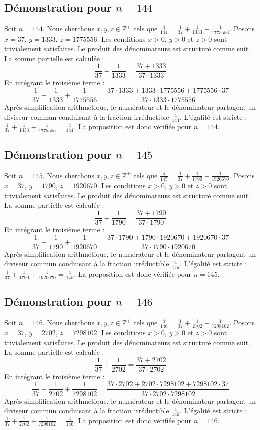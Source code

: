\documentclass[11pt,a4paper]{article}
\begin{document}
\subsection{Démonstration pour $n = 144$}
Soit $n = 144$. Nous cherchons $x, y, z \in \mathbb{Z}^{+}$ tels que $\frac{4}{144} = \frac{1}{37} + \frac{1}{1333} + \frac{1}{1775556}$.
Posons $x = 37$, $y = 1333$, $z = 1775556$.
Les conditions $x > 0$, $y > 0$ et $z > 0$ sont trivialement satisfaites.
Le produit des dénominateurs est structuré comme suit. La somme partielle est calculée :
$$ \frac{1}{37} + \frac{1}{1333} = \frac{37+1333}{37 \cdot 1333} $$
En intégrant le troisième terme :
$$ \frac{1}{37} + \frac{1}{1333} + \frac{1}{1775556} = \frac{37 \cdot 1333 + 1333 \cdot 1775556 + 1775556 \cdot 37}{37 \cdot 1333 \cdot 1775556} $$
Après simplification arithmétique, le numérateur et le dénominateur partagent un diviseur commun conduisant à la fraction irréductible $\frac{4}{144}$.
L'égalité est stricte : $\frac{1}{37} + \frac{1}{1333} + \frac{1}{1775556} = \frac{4}{144}$.
La proposition est donc vérifiée pour $n = 144$.
\subsection{Démonstration pour $n = 145$}
Soit $n = 145$. Nous cherchons $x, y, z \in \mathbb{Z}^{+}$ tels que $\frac{4}{145} = \frac{1}{37} + \frac{1}{1790} + \frac{1}{1920670}$.
Posons $x = 37$, $y = 1790$, $z = 1920670$.
Les conditions $x > 0$, $y > 0$ et $z > 0$ sont trivialement satisfaites.
Le produit des dénominateurs est structuré comme suit. La somme partielle est calculée :
$$ \frac{1}{37} + \frac{1}{1790} = \frac{37+1790}{37 \cdot 1790} $$
En intégrant le troisième terme :
$$ \frac{1}{37} + \frac{1}{1790} + \frac{1}{1920670} = \frac{37 \cdot 1790 + 1790 \cdot 1920670 + 1920670 \cdot 37}{37 \cdot 1790 \cdot 1920670} $$
Après simplification arithmétique, le numérateur et le dénominateur partagent un diviseur commun conduisant à la fraction irréductible $\frac{4}{145}$.
L'égalité est stricte : $\frac{1}{37} + \frac{1}{1790} + \frac{1}{1920670} = \frac{4}{145}$.
La proposition est donc vérifiée pour $n = 145$.
\subsection{Démonstration pour $n = 146$}
Soit $n = 146$. Nous cherchons $x, y, z \in \mathbb{Z}^{+}$ tels que $\frac{4}{146} = \frac{1}{37} + \frac{1}{2702} + \frac{1}{7298102}$.
Posons $x = 37$, $y = 2702$, $z = 7298102$.
Les conditions $x > 0$, $y > 0$ et $z > 0$ sont trivialement satisfaites.
Le produit des dénominateurs est structuré comme suit. La somme partielle est calculée :
$$ \frac{1}{37} + \frac{1}{2702} = \frac{37+2702}{37 \cdot 2702} $$
En intégrant le troisième terme :
$$ \frac{1}{37} + \frac{1}{2702} + \frac{1}{7298102} = \frac{37 \cdot 2702 + 2702 \cdot 7298102 + 7298102 \cdot 37}{37 \cdot 2702 \cdot 7298102} $$
Après simplification arithmétique, le numérateur et le dénominateur partagent un diviseur commun conduisant à la fraction irréductible $\frac{4}{146}$.
L'égalité est stricte : $\frac{1}{37} + \frac{1}{2702} + \frac{1}{7298102} = \frac{4}{146}$.
La proposition est donc vérifiée pour $n = 146$.
\end{document}
